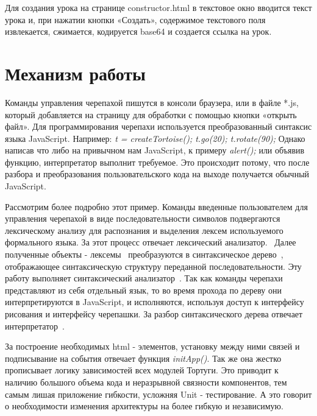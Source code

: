 Для создания урока на странице constructor.html в текстовое окно вводится текст урока и, при нажатии кнопки «Создать», содержимое текстового поля извлекается, сжимается, кодируется base64 и создается ссылка на урок.\par


\section{Механизм работы} \label{sect1_1}
Команды управления черепахой пишутся в консоли браузера, или в файле *.js, который добавляется на страницу для обработки с помощью кнопки «открыть файл». Для программирования черепахи используется преобразованный синтаксис языка JavaScript. Например:
\textit{
t = createTortoise();
t.go(20);
t.rotate(90);
}
Однако написав что либо на привычном нам JavaScript, к примеру \textit{alert();} или объявив функцию, интерпретатор выполнит требуемое. Это происходит потому, что после разбора и преобразования пользовательского кода на выходе получается обычный JavaScript.

Рассмотрим более подробно этот пример. Команды введенные пользователем для управления черепахой в виде последовательности символов подвергаются лексическому анализу для распознания и выделения лексем используемого формального языка. За этот процесс отвечает лексический анализатор.~\cite{lecsich} Далее полученные объекты - лексемы~\cite{lecsem} преобразуются в синтаксическое дерево~\cite{sintacsichder}, отображающее синтаксическую структуру переданной последовательности. Эту работу выполняет синтаксический анализатор~\cite{sintacsichanaliz}. Так как команды черепахи представляют из себя отдельный язык, то во время прохода по дереву они интерпретируются в JavaScript, и исполняются, используя доступ к интерфейсу рисования и интерфейсу черепашки. За разбор синтаксического дерева отвечает интерпретатор~\cite{interpret}.

За построение необходимых html - элементов, установку между ними связей и подписывание на события отвечает функция \textit{initApp()}. Так же она жестко прописывает логику зависимостей всех модулей Тортуги. Это приводит к наличию большого объема кода и неразрывной связности компонентов, тем самым лишая приложение гибкости, усложняя Unit - тестирование. А это говорит о необходимости изменения архитектуры на более гибкую и независимую.



